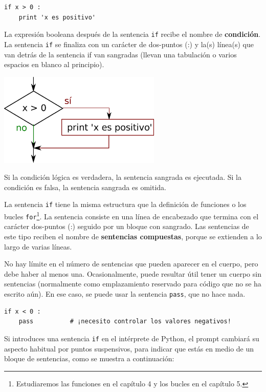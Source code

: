 \beforeverb
\begin{verbatim}
if x > 0 :
    print 'x es positivo'
\end{verbatim}
\afterverb
%
La expresión booleana después de la sentencia {\tt if} recibe
el nombre de {\bf condición}. La sentencia {\tt if} se finaliza
con un carácter de dos-puntos (:) y la(s) línea(s) que van detrás de
la sentencia if van sangradas (llevan una tabulación o varios espacios en blanco al principio).

\beforefig
\centerline{\includegraphics[height=1.75in]{figs2/if.eps}}
\afterfig

Si la condición lógica es verdadera, la sentencia sangrada
es ejecutada. Si la condición es falsa,
la sentencia sangrada es omitida.


La sentencia {\tt if} tiene la misma estructura que la definición de funciones
o los bucles {\tt for}\footnote{Estudiaremos las funciones en el capítulo 4
y los bucles en el capítulo 5.}. La sentencia consiste en una línea de encabezado
que termina con el carácter dos-puntos (:)
seguido por un bloque con sangrado. Las sentencias de este tipo
reciben el nombre de {\bf sentencias compuestas}, porque se extienden
a lo largo de varias líneas.

No hay límite en el número de sentencias que pueden aparecer en el
cuerpo, pero debe haber al menos una.
Ocasionalmente, puede resultar útil tener un cuerpo sin sentencias
(normalmente como emplazamiento reservado para código que no se ha escrito aún). En ese
caso, se puede usar la sentencia {\tt pass}, que no hace nada.


\beforeverb
\begin{verbatim}
if x < 0 :
    pass          # ¡necesito controlar los valores negativos!
\end{verbatim}
\afterverb
%
Si introduces una sentencia {\tt if} en el intérprete de Python, el prompt cambiará
su aspecto habitual por puntos suspensivos, para indicar que estás en medio de un bloque de sentencias, como
se muestra a continuación:

